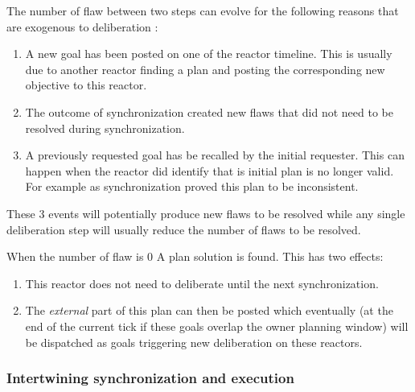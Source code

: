The number of flaw between two steps can evolve for the following
reasons that are exogenous to deliberation :
\begin{enumerate}
\item A new goal has been posted on one of the reactor timeline. This
  is usually due to another reactor finding a plan and posting the
  corresponding new objective to this reactor.
\item The outcome of synchronization created new flaws that did not
  need to be resolved during synchronization.
\item A previously requested goal has be recalled by the initial
  requester. This can happen when the reactor did identify that is
  initial plan is no longer valid. For example as synchronization
  proved this plan to be inconsistent.
\end{enumerate}
These 3 events will potentially produce new flaws to be resolved while
any single deliberation step will usually reduce the number of flaws
to be resolved.

When the number of flaw is 0 A plan solution is found. This has two
effects:
\begin{enumerate}
\item This reactor does not need to deliberate until the next synchronization.
\item The {\em external} part of this plan can then be posted which
  eventually (at the end of the current tick if these goals overlap
  the owner planning window) will be dispatched as goals triggering
  new deliberation on these reactors.
\end{enumerate}


\subsubsection{Intertwining synchronization and execution }
\label{sec:arch:intertwine}








